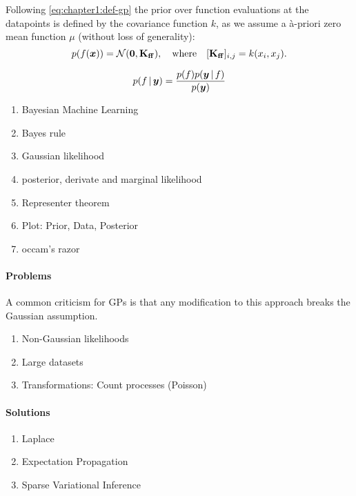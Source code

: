 Following \cref{eq:chapter1:def-gp} the prior over function evaluations at the datapoints is defined by the covariance function $k$, as we assume a \`a-priori zero mean function $\mu$ (without loss of generality):
\begin{equation} 
  p(f(\vx)) = \NormDist{\vzero, \Kff},\quad\text{where}\quad [\Kff]_{i,j} = k(x_i, x_j).
\end{equation}


\begin{equation}
  p(f \,|\, \bm{y}) = \frac{p(f) p(\bm{y} \,|\, f)}{p(\bm{y})}
\end{equation}

\begin{enumerate}
  \item Bayesian Machine Learning
  \item Bayes rule
  \item Gaussian likelihood
  \item posterior, derivate and marginal likelihood
  \item Representer theorem
  \item Plot: Prior, Data, Posterior
  \item occam's razor
\end{enumerate}

\paragraph{Problems}
A common criticism for GPs is that any modification to this approach breaks the Gaussian assumption. 
\begin{enumerate}
  \item Non-Gaussian likelihoods
  \item Large datasets
  \item Transformations: Count processes (Poisson)
\end{enumerate}

\paragraph{Solutions}
\begin{enumerate}
  \item Laplace
  \item Expectation Propagation
  \item Sparse Variational Inference
\end{enumerate}


